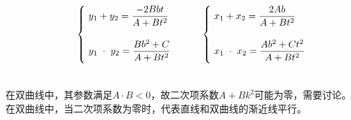\documentclass[UTF8]{ctexart}
\begin{document}
    \begin{large}
        \begin{equation*}
            ~~~~~~~~~~\begin{cases}
                ~y_1+y_2=\dfrac{-2Bbt}{A+Bt^2}\\[6mm]
                ~y_1\hspace{3.0pt}\cdot\hspace{3.0pt}y_2=\dfrac{Bb^2+C}{A+Bt^2}\\[2mm]
            \end{cases}~~~~~~
            \begin{cases}
                ~x_1+x_2=\dfrac{2Ab}{A+Bt^2}\\[6mm]
                ~x_1\hspace{3.0pt}\cdot\hspace{3.0pt}x_2=\dfrac{Ab^2+Ct^2}{A+Bt^2}\\[2mm]
            \end{cases}
        \end{equation*}
    \end{large}\\[3mm]
    在双曲线中，其参数满足$A\cdot B<0$，故二次项系数$A+Bk^2$可能为零，需要讨论。\\[3mm]
    在双曲线中，当二次项系数为零时，代表直线和双曲线的渐近线平行。
    
\newpage
\end{document}
